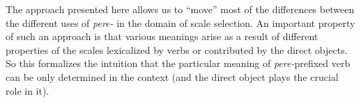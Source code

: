 


The approach presented here allows us to ``move'' most of the differences between the different uses of \textit{pere-} in the domain of scale selection. An important property of such an approach is that various meanings arise as a result of different properties of the scales lexicalized by verbs or contributed by the direct objects. So this formalizes the intuition that the particular meaning of \textit{pere-}prefixed verb can be only determined in the context (and the direct object plays the crucial role in it). 

